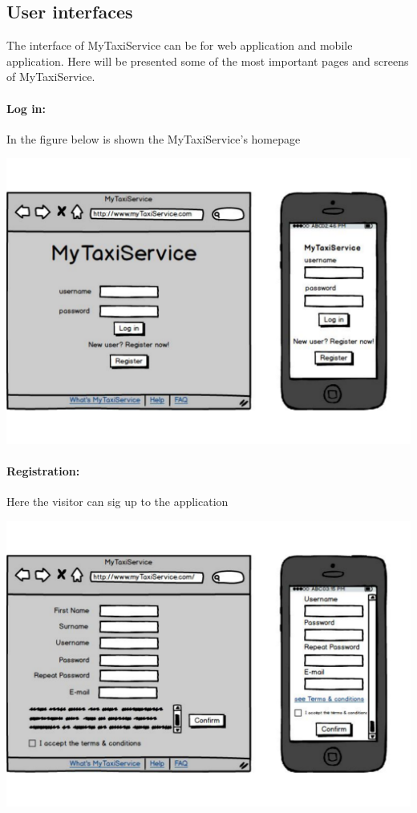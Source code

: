 \subsection{User interfaces}
The interface of MyTaxiService can be for web application and mobile application. Here will be presented some of the most important pages and screens of MyTaxiService.

\paragraph{Log in:}
	In the figure below is shown the MyTaxiService's homepage
	\begin{center}
		\includegraphics[width=\textwidth]{mockup/login.pdf}
	\end{center}
	
\paragraph{Registration:}
	Here the visitor can sig up to the application
\begin{center}
	\includegraphics[width=\textwidth]{mockup/registration.pdf}
\end{center}

